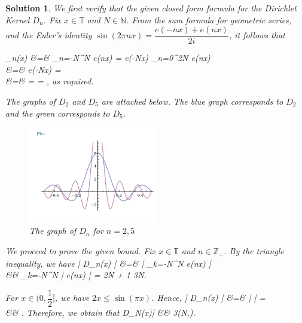 \documentclass{article} %
\def\eQb#1\eQe{\begin{eqnarray*}#1\end{eqnarray*}}
\theoremstyle{quest}
\newtheorem*{solution}{Solution}
\begin{document}
\begin{solution}
We first verify that the given closed form formula for the Dirichlet Kernel $D_n$. Fix 
$x \in \mathbb{T}$ and $N \in \mathbb{N}$. 
From the sum formula for geometric series, and the Euler's identity $
\sin(2\pi nx) = \dfrac{e(-nx) + e(nx)}{2i}$, it follows that 


\eQb
D_{n}(x) &=& \sum_{n=-N}^{N} e(nx) = e(-Nx) \sum_{n=0}^{2N} e(nx) \\
&=& e(-Nx)  =  \\
&=&  
=  =
,
\eQe
as required.

\pagebreak

 The graphs of $D_2$ and $D_5$ are attached below. The blue graph
corresponds to $D_2$ and the green corresponds to $D_5$.
\begin{figure}[!ht]
  \caption{The graph of $D_n$ for $n=2,5$}
  \centering
    \includegraphics[width=0.5\textwidth]{Dirichlet-plot}
\end{figure}

\smallskip

We proceed to prove the given bound. Fix $x \in \mathbb{T}$ and
$n \in \mathbb{Z}_{+}$. By the triangle inequality, we have
\eQb
\left| D_n(x) \right| &=& \left| \sum_{k=-N}^{N} e(nx) \right| \\ 
&\leq& \sum_{k=-N}^{N} \left| e(nx) \right| = 2N + 1 \leq 3N. \\ 
\eQe

For $ x \in (0,\dfrac{1}{2}]$, we have $2x \leq \sin(\pi x)$. Hence, 
\eQb
\left| D_n(x) \right| 
&=& \left|  \right| = 
  \\
&\leq&   \leq {}.
\eQe
Therefore, we obtain that
\eQb
|D_N(x)| &\leq& 3\min(N,). \\
\eQe


\end{solution}
\end{document}
